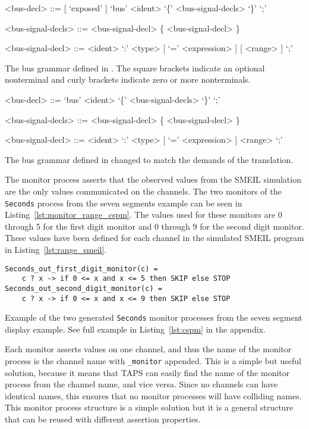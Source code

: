 \begin{listing}
    \begin{grammar}
    <bus-decl> ::= [ `exposed' ] `bus' <ident> `\{' <bus-signal-decls> `\}'  `;'

    <bus-signal-decls> ::= <bus-signal-decl> \{ <bus-signal-decl> \}

    <bus-signal-decl> ::= <ident> `:' <type> [ `=' <expression> ] [ <range> ] `;'
    \end{grammar}
    \caption{The bus grammar defined in \cite{Asheim2018}. The square brackets indicate an optional nonterminal and curly brackets indicate zero or more nonterminals.}
    \label{lst:smeil_bus_grammar}
\end{listing}
\begin{listing}
    \begin{grammar}
    <bus-decl> ::= `bus' <ident> `\{' <bus-signal-decls> `\}'  `;'

    <bus-signal-decls> ::= <bus-signal-decl> \{ <bus-signal-decl> \}

    <bus-signal-decl> ::= <ident> `:' <type> [ `=' <expression> ] <range> `;'
    \end{grammar}
    \caption{The bus grammar defined in \cite{Asheim2018} changed to match the demands of the translation.}
    \label{lst:smeil_bus_grammar_no_option}
\end{listing}
The monitor process asserts that the observed values from the SMEIL simulation are the only values communicated on the channels. The two monitors of the \texttt{Seconds} process from the seven segments example can be seen in Listing~\ref{lst:monitor_range_cspm}. The values used for these monitors are 0 through 5 for the first digit monitor and 0 through 9 for the second digit monitor. These values have been defined for each channel in the simulated SMEIL program in Listing~\ref{lst:range_smeil}.
\begin{listing}
\begin{verbatim}
Seconds_out_first_digit_monitor(c) =
    c ? x -> if 0 <= x and x <= 5 then SKIP else STOP
Seconds_out_second_digit_monitor(c) =
    c ? x -> if 0 <= x and x <= 9 then SKIP else STOP
\end{verbatim}
\caption{Example of the two generated \texttt{Seconds} monitor processes from the seven segment display example. See full example in Listing~\ref{lst:cspm} in the appendix.}
\label{lst:monitor_range_cspm}
\end{listing}
Each monitor asserts values on one channel, and thus the name of the monitor process is the channel name with \texttt{\_monitor} appended. This is a simple but useful solution, because it means that TAPS can easily find the name of the monitor process from the channel name, and vice versa.
Since no \cspm{} channels can have identical names, this ensures that no monitor processes will have colliding names.
This monitor process structure is a simple solution but it is a general structure that can be reused with different assertion properties.
